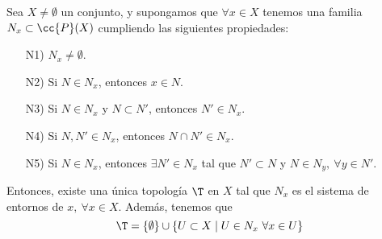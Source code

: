 \begin{teo}[Hausdorff] \label{teo:TopGenerada_Entornos}
    Sea $X\neq\emptyset$ un conjunto, y supongamos que $\forall x\in X$ tenemos una familia $N_x\subset \cc{P}(X)$ cumpliendo las siguientes propiedades:
    \begin{enumerate}
        \item[N1)] $N_x\neq \emptyset$.
        \item[N2)] Si $N\in N_x$, entonces $x\in N$.
        \item[N3)] Si $N\in N_x$ y $N\subset N'$, entonces $N'\in N_x$.
        \item[N4)] Si $N,N'\in N_x$, entonces $N\cap N'\in N_x$.
        \item[N5)] Si $N\in N_x$, entonces $\exists N'\in N_x$ tal que $N'\subset N$ y $N\in N_y,~\forall y\in N'$. 
    \end{enumerate}

    Entonces, existe una única topología $\T$ en $X$ tal que $N_x$ es el sistema de entornos de $x,~\forall x\in X$. Además, tenemos que
    $$\T=\{\emptyset\}\cup \{U\subset X\mid U\in N_x~\forall x\in U\}$$
\end{teo}
